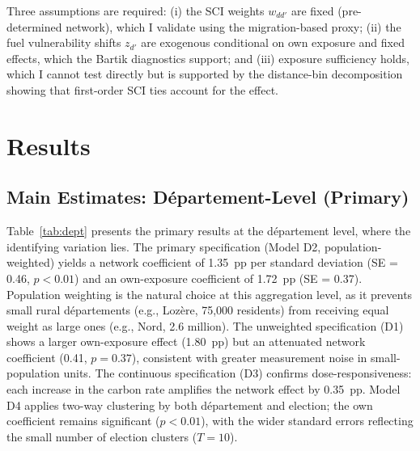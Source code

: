 \documentclass[12pt]{article}
\providecommand{\euro}{\texteuro}
\newcommand{\dept}{d\'{e}partement}
\newcommand{\depts}{d\'{e}partements}
\begin{document}
Three assumptions are required: (i) the SCI weights $w_{dd'}$ are fixed (pre-determined network), which I validate using the migration-based proxy; (ii) the fuel vulnerability shifts $z_{d'}$ are exogenous conditional on own exposure and fixed effects, which the Bartik diagnostics support; and (iii) exposure sufficiency holds, which I cannot test directly but is supported by the distance-bin decomposition showing that first-order SCI ties account for the effect.



\section{Results}
\label{sec:results}

\subsection{Main Estimates: D\'{e}partement-Level (Primary)}

Table~\ref{tab:dept} presents the primary results at the \dept{} level, where the identifying variation lies. The primary specification (Model D2, population-weighted) yields a network coefficient of 1.35~pp per standard deviation (SE = 0.46, $p < 0.01$) and an own-exposure coefficient of 1.72~pp (SE = 0.37). Population weighting is the natural choice at this aggregation level, as it prevents small rural \depts{} (e.g., Loz\`{e}re, 75,000 residents) from receiving equal weight as large ones (e.g., Nord, 2.6 million). The unweighted specification (D1) shows a larger own-exposure effect (1.80~pp) but an attenuated network coefficient (0.41, $p = 0.37$), consistent with greater measurement noise in small-population units. The continuous specification (D3) confirms dose-responsiveness: each \euro 10 increase in the carbon rate amplifies the network effect by 0.35~pp. Model D4 applies two-way clustering by both \dept{} and election; the own coefficient remains significant ($p < 0.01$), with the wider standard errors reflecting the small number of election clusters ($T = 10$).
\end{document}
